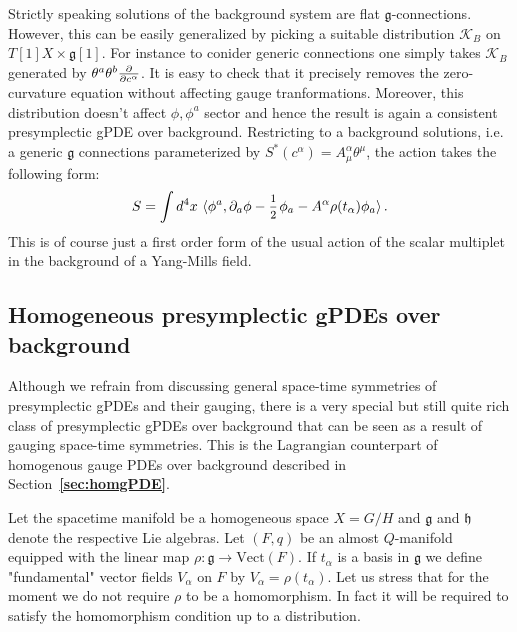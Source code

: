 \documentclass[a4paper,12pt]{article}
\numberwithin{equation}{section} %
\newcommand{\bref}[1]{\textbf{\ref{#1}}}
\renewcommand{\d}{\partial}
\newcommand{\inner}[2]{\langle #1{,}\,#2\rangle}
\newcommand{\half}{\mathchoice{%
    \ffrac{1}{2}}{\frac{1}{2}}{\frac{1}{2}}{\frac{1}{2}}}
\newcommand{\ffrac}[2]{\raisebox{.5pt}%
  {\footnotesize$\displaystyle\frac{#1}{#2}$}\kern1pt}
\newcommand{\dl}[1]{\mathchoice{\ffrac{\d}{\d #1}}{\frac{\d}{\d #1}}{\ffrac{\d}{\d #1}}{\ffrac{\d}{\d #1}}}
\newcommand{\Liealg}{\mathfrak}
\newcommand{\algg}{\Liealg{g}}
\newcommand{\algh}{\Liealg{h}}
\def\cK{\mathcal{K}}
\begin{document}
Strictly speaking solutions of the background system are flat $\algg$-connections. However, this can be easily generalized by picking a suitable distribution $\cK_B$ on $T[1]X\times \algg[1]$. For instance to conider generic connections one simply takes $\cK_B$ generated by $\theta^a\theta^b\dl{c^\alpha}$. It is easy to check that it precisely removes the zero-curvature equation without affecting gauge tranformations. Moreover, this distribution doesn't affect $\phi,\phi^a$ sector and hence the result is again a consistent presymplectic gPDE over background. Restricting to a background solutions, i.e. a generic $\mathfrak{g}$ connections parameterized by $S^*(c^\alpha) = A^\alpha_\mu \theta^\mu$, the action takes the following form:
\begin{equation}\label{gauged-scalar}
    S = \int d^4x \,\,\inner{\phi^a}{\partial_a\phi -\half \phi_{a} - A^{\alpha}\rho(t_{\alpha})\phi_a}\,.
\end{equation}
This is of course just a first order form of the usual action of the scalar multiplet in the background of a Yang-Mills field.



\subsection{Homogeneous presymplectic gPDEs over background}

Although we refrain from discussing general space-time symmetries of presymplectic gPDEs and their gauging, there is a very special but still quite rich class of presymplectic gPDEs over background that can be seen as a result of gauging space-time symmetries. This is the Lagrangian counterpart of homogenous gauge PDEs over background described in Section~\bref{sec:homgPDE}.

Let the spacetime manifold be a homogeneous space $X = G/H$ and $\algg$ and $\algh$ denote the respective Lie algebras. Let  $(F,q)$ be an almost $Q$-manifold equipped with the linear map $\rho:\algg\to \mathrm{Vect}(F)$. If $t_\alpha$ is a basis in $\algg$ we define "fundamental" vector fields $V_\alpha$ on $F$ by $V_\alpha=\rho(t_\alpha)$. Let us stress that for the moment we do not require $\rho$ to be a homomorphism. In fact it will be required to satisfy the homomorphism condition up to a distribution.
\end{document}
